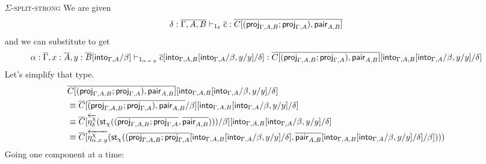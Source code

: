 \documentclass[10pt]{article}
\theoremstyle{definition}
\newcommand\dsd[1]{\ensuremath{\mathsf{#1}}}
\newcommand{\yields}{\vdash}
\newcommand{\app}[2]{\ensuremath{#1 \: #2}}
\newcommand{\fst}[1]{\app{\dsd{fst}}{#1}}
\newcommand{\snd}[1]{\app{\dsd{snd}}{#1}}
\newcommand{\rewrite}[2]{\overleftarrow{#1}(#2)}
\newcommand\StI[2]{\ensuremath{\mathsf{st}_{#1}(#2)}}
\newcommand\StE[4]{\ensuremath{\mathsf{let} \, \StI{#1}{#3} \, = \, {#2} \, \mathsf{in} \, #4}}
\begin{document}
\begin{enumerate}[style = multiline, labelwidth = 80pt]

\item[\textsc{$\Sigma$-split-strong}] We are given
\begin{align*}
\delta : \upstairs{\Gamma, A, B} \yields_{1_\delta} \upstairs{c} :\upstairs{C[(\proj{\Gamma, A, B};\proj{\Gamma, A}), \qpair{A,B}]} 
\end{align*}
and we can substitute to get
\begin{align*}
\alpha : \upstairs{\Gamma}, x : \upstairs{A}, y : \upstairs{B}[\into{\Gamma,A}/\beta] \yields_{1_{\alpha.x.y}} \upstairs{c}[\into{\Gamma, A, B}[\into{\Gamma, A}/\beta, y/y] /\delta] : \upstairs{C[(\proj{\Gamma, A, B};\proj{\Gamma, A}), \qpair{A,B}]}[\into{\Gamma, A, B}[\into{\Gamma, A}/\beta, y/y] /\delta]
\end{align*}
Let's simplify that type.
\begin{align*}
&\upstairs{C[(\proj{\Gamma, A, B};\proj{\Gamma, A}), \qpair{A,B}]}[\into{\Gamma, A, B}[\into{\Gamma, A}/\beta, y/y] /\delta] \\
&\equiv \upstairs{C}[\upstairs{(\proj{\Gamma, A, B};\proj{\Gamma, A}), \qpair{A,B}}/\beta][\into{\Gamma, A, B}[\into{\Gamma, A}/\beta, y/y] /\delta] \\
&\equiv \upstairs{C}[\rewrite{\eta^\chi_{\delta}}{\StI{\chi}{(\upstairs{\proj{\Gamma, A, B};\proj{\Gamma, A}}, \upstairs{\qpair{A,B}})}}/\beta][\into{\Gamma, A, B}[\into{\Gamma, A}/\beta, y/y] /\delta] \\
&\equiv \upstairs{C}[\rewrite{\eta^\chi_{\alpha.x.y}}{\StI{\chi}{(\upstairs{\proj{\Gamma, A, B};\proj{\Gamma, A}}[\into{\Gamma, A, B}[\into{\Gamma, A}/\beta, y/y] /\delta], \upstairs{\qpair{A,B}}[\into{\Gamma, A, B}[\into{\Gamma, A}/\beta, y/y] /\delta]/\beta])}}
\end{align*}
Going one component at a time:

\end{enumerate}
\end{document}

